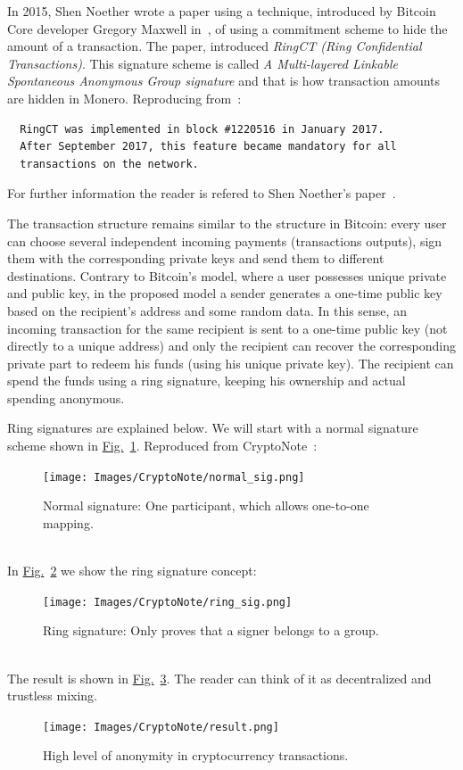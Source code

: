 In 2015, Shen Noether wrote a paper using a technique, introduced by Bitcoin Core developer Gregory Maxwell in~\cite{CT}, of using a commitment scheme to hide the amount of a transaction. The paper, introduced \emph{RingCT (Ring Confidential Transactions)}. This signature scheme is called \emph{A Multi-layered Linkable Spontaneous Anonymous Group signature} and that is how transaction amounts are hidden in Monero. Reproducing from~\cite{getmonero}:

\begin{verbatim}
  RingCT was implemented in block #1220516 in January 2017.
  After September 2017, this feature became mandatory for all
  transactions on the network.
\end{verbatim}
For further information the reader is refered to Shen Noether's paper~\cite{ringCT}.

The transaction structure remains similar to the structure in Bitcoin: every user can choose several independent incoming payments (transactions outputs), sign them with the corresponding private keys and send them to different destinations. Contrary to Bitcoin’s model, where a user possesses unique private and public key, in the proposed model a sender generates a one-time public key based on the recipient’s address and some random data. In this sense, an incoming transaction for the same recipient is sent to a one-time public key (not directly  to a unique  address) and only the recipient can recover the corresponding private part to redeem his funds (using his unique private key). The recipient can spend the funds using a ring signature, keeping his ownership and actual spending anonymous.

\noindent Ring signatures are explained below. We will start with a normal signature scheme shown in \hyperref[fig:normal_sig]{Fig.}~\ref{fig:normal_sig}. Reproduced from CryptoNote~\cite{cryptonote}:\\
\begin{figure}[ht]
  \centering
  \texttt{[image: Images/CryptoNote/normal\_sig.png]}
  \caption{Normal signature: One participant, which allows one-to-one mapping.}
  \label{fig:normal_sig}
\end{figure}\\
In \hyperref[fig:ring_sig]{Fig.}~\ref{fig:ring_sig} we show the ring signature concept:\\
\begin{figure}[ht]
  \centering
  \texttt{[image: Images/CryptoNote/ring\_sig.png]}
  \caption{Ring signature: Only proves that a signer belongs to a group.}
  \label{fig:ring_sig}
\end{figure}\\
The result is shown in \hyperref[fig:result]{Fig.}~\ref{fig:result}. The reader can think of it as decentralized and trustless mixing.
\begin{figure}[ht]
  \centering
  \texttt{[image: Images/CryptoNote/result.png]}
  \caption{High level of anonymity in cryptocurrency transactions.}
  \label{fig:result}
\end{figure}

